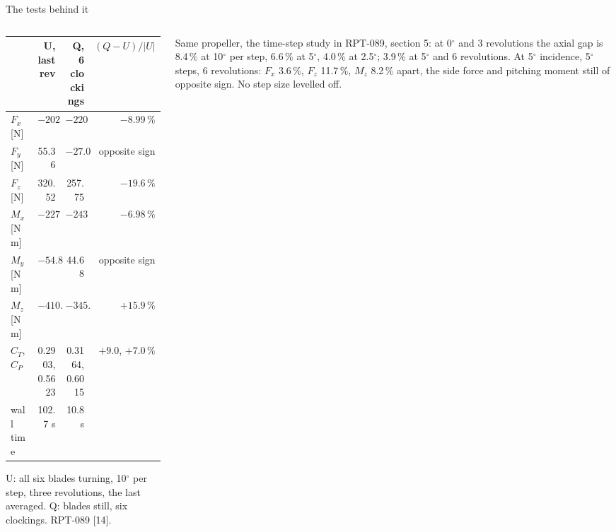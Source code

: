 \begin{frame}{The tests behind it}
\begin{columns}[T]
\begin{column}{0.60\textwidth}
{\ftstablesize\renewcommand{\arraystretch}{1.05}
\begin{tabular*}{\linewidth}{@{\extracolsep{\fill}}lrrr@{}}
\toprule
 & U, last rev & Q, 6 clockings & \((Q-U)/|U|\) \\
\midrule
\(F_x\) [N] & \(-2022.76\) & \(-2204.64\) & \(-8.99\,\%\) \\
\(F_y\) [N] & 55.36 & \(-27.09\) & opposite sign \\
\(F_z\) [N] & 320.52 & 257.75 & \(-19.6\,\%\) \\
\(M_x\) [N m] & \(-2274.67\) & \(-2433.44\) & \(-6.98\,\%\) \\
\(M_y\) [N m] & \(-54.83\) & 44.68 & opposite sign \\
\(M_z\) [N m] & \(-410.73\) & \(-345.45\) & \(+15.9\,\%\) \\
\midrule
\(C_T\), \(C_P\) & 0.2903, 0.5623 & 0.3164, 0.6015 & \(+9.0\), \(+7.0\,\%\) \\
wall time & 102.7 s & 10.8 s & \\
\bottomrule
\end{tabular*}}
\par\vspace{0.5mm}
{\tiny\color{SoftGray} U: all six blades turning, 10\(^\circ\) per step, three
revolutions, the last averaged. Q: blades still, six clockings. RPT-089
[14].\par}
\end{column}
\begin{column}{0.37\textwidth}
\begin{ftsevidence}
\scriptsize Same propeller, the time-step study in RPT-089, section 5: at 0\(^\circ\) and 3 revolutions the axial gap is 8.4\,\% at
10\(^\circ\) per step, 6.6\,\% at 5\(^\circ\), 4.0\,\% at 2.5\(^\circ\); 3.9\,\%
at 5\(^\circ\) and 6 revolutions. At 5\(^\circ\) incidence, 5\(^\circ\) steps,
6 revolutions: \(F_x\) 3.6\,\%, \(F_z\) 11.7\,\%, \(M_z\) 8.2\,\% apart, the
side force and pitching moment still of opposite sign. No step size levelled
off.
\end{ftsevidence}
\end{column}
\end{columns}
\end{frame}

